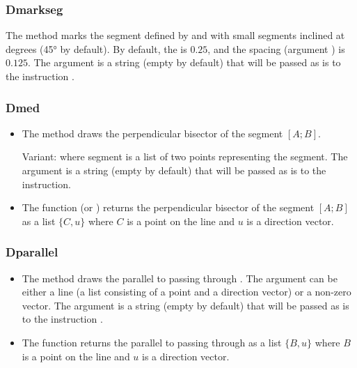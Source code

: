 \subsubsection{Dmarkseg}
The method  marks the segment defined by  and  with  small segments inclined at  degrees (45° by default). By default, the  is $0.25$, and the spacing (argument ) is $0.125$. The argument  is a string (empty by default) that will be passed as is to the instruction \drawcmd.

\subsubsection{Dmed}
\begin{itemize}
    \item The  method draws the perpendicular bisector of the segment $[A;B]$.

Variant:  where segment is a list of two points representing the segment. The  argument is a string (empty by default) that will be passed as is to the \drawcmd instruction. \arguScale

     \item The function  (or ) returns the perpendicular bisector of the segment $[A;B]$ as a list $\{C,u\}$ where $C$ is a point on the line and $u$ is a direction vector.
\end{itemize}

\subsubsection{Dparallel}
\begin{itemize}
    \item The method  draws the parallel to  passing through . The argument  can be either a line (a list consisting of a point and a direction vector) or a non-zero vector. The argument  is a string (empty by default) that will be passed as is to the instruction \drawcmd. \arguScale
    
    \item The function  returns the parallel to  passing through  as a list $\{B,u\}$ where $B$ is a point on the line and $u$ is a direction vector.
\end{itemize}

